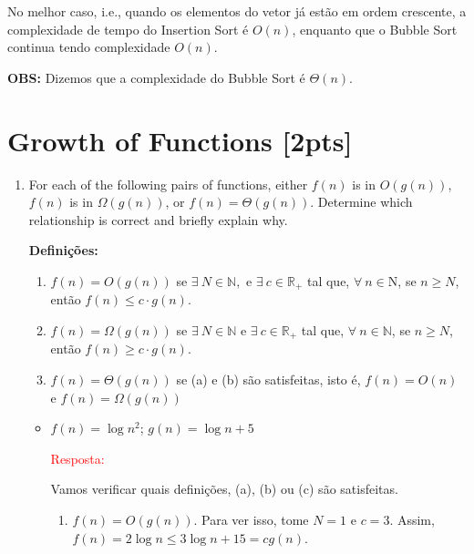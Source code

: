 \documentclass{article}
\begin{document}
No melhor caso, i.e., quando os elementos do vetor já estão em ordem crescente, a complexidade de tempo do Insertion Sort é $O(n)$, enquanto que o Bubble Sort continua tendo complexidade $O(n)$. 

\vspace{\baselineskip}

\textbf{OBS:} Dizemos que a complexidade do Bubble Sort é $\Theta(n)$.



\section{Growth of Functions [2pts]}

\begin{enumerate}[label=\Alph*]
  \item For each of the following pairs of functions, either $f(n)$ is in $O(g(n))$, $f(n)$ is in $\Omega(g(n))$, or $f(n) = \Theta(g(n))$. Determine which relationship is correct and briefly explain why.
  
  \textbf{Definições:}
  \begin{enumerate}[itemsep=0cm,label=(\alph*)]
      \item $ f(n)=O(g(n))$ se $\exists~N \in \mathbb{N}, \text{ e } \exists~c \in \mathbb{R}_+$ tal que, $\forall~n \in \mathrm{N}$, se $n \geq N$, então $ f(n) \leq c \cdot g(n)$.
      
      \item $f(n)=\Omega(g(n))$ se $\exists~N \in \mathbb{N} \text{ e } \exists~c \in \mathbb{R}_+$ tal que, $\forall~n \in \mathbb{N}$, se $n \geq N$, então $f(n) \geq c\cdot g(n)$.
      
      \item $f(n)=\Theta(g(n))$ se (a) e (b) são satisfeitas, isto é, $f(n)=O(n)$ e $f(n)=\Omega(g(n))$
  \end{enumerate}
  
    \begin{itemize}
      \item $f(n) = \log n^2$; $g(n) = \log n + 5$
      
      \textcolor{red}{Resposta: } 
      
      Vamos verificar quais definições, (a), (b) ou (c) são satisfeitas.
      
      \begin{enumerate}[itemsep=0cm, label=(\alph*)]
          \item $f(n)=O(g(n))$. Para ver isso, tome $N=1$ e $c=3$. Assim, 
          $f(n)=2 \log n \leq 3 \log n+15=c g(n)$. 
          

\end{enumerate}
\end{itemize}
\end{enumerate}
\end{document}
